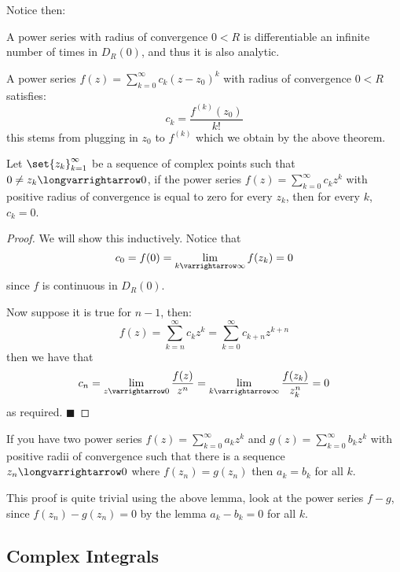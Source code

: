 \documentclass[10pt]{article}
\let\to=\varrightarrow
\let\longto=\longvarrightarrow
\def\qed{\hskip1cm\hbox{}\hfill$\blacksquare$}
\begin{document}
Notice then:

\benum
    \item A power series with radius of convergence $0<R$ is differentiable an infinite number of times in $D_R(0)$, and thus it is also analytic.
    \item A power series $f(z)=\sum_{k=0}^\infty c_k(z-z_0)^k$ with radius of convergence $0<R$ satisfies:
    \[ c_k = \frac{f^{(k)}(z_0)}{k!} \]
    this stems from plugging in $z_0$ to $f^{(k)}$ which we obtain by the above theorem.
\eenum

\begin{lemm*}

    Let $\set{z_k}_{k=1}^\infty$ be a sequence of complex points such that $0\neq z_k\longto0$, if the power series $f(z)=\sum_{k=0}^\infty c_kz^k$ with positive radius of convergence is equal to zero for
    every $z_k$, then for every $k$, $c_k=0$.

\end{lemm*}

\begin{proof}

    We will show this inductively.
    Notice that
    \[ c_0 = f(0) = \lim_{k\to\infty}f(z_k) = 0 \]
    since $f$ is continuous in $D_R(0)$.

    Now suppose it is true for $n-1$, then:
    \[ f(z) = \sum_{k=n}^\infty c_kz^k = \sum_{k=0}^\infty c_{k+n}z^{k+n} \]
    then we have that
    \[ c_n = \lim_{z\to0}\frac{f(z)}{z^n} = \lim_{k\to\infty}\frac{f(z_k)}{z_k^n} = 0 \]
    as required.
    \qed

\end{proof}

\begin{thrm*}

    If you have two power series $f(z)=\sum_{k=0}^\infty a_kz^k$ and $g(z)=\sum_{k=0}^\infty b_kz^k$ with positive radii of convergence such that there is a sequence $z_n\longto0$ where $f(z_n)=g(z_n)$
    then $a_k=b_k$ for all $k$.

\end{thrm*}

This proof is quite trivial using the above lemma, look at the power series $f-g$, since $f(z_n)-g(z_n)=0$ by the lemma $a_k-b_k=0$ for all $k$.

\subsection{Complex Integrals}
\end{document}
